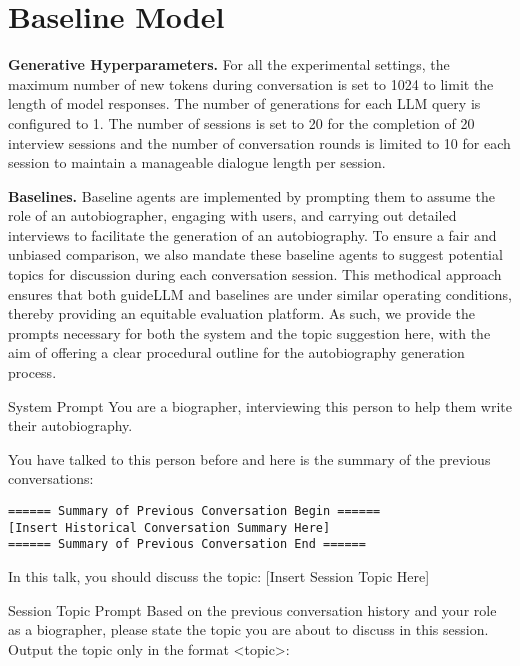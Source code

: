 \section{Baseline Model}\label{appendix:baseline_prompts}


\noindent\textbf{Generative Hyperparameters.} For all the experimental settings, the maximum number of new tokens during conversation is set to 1024 to limit the length of model responses. The number of generations for each LLM query is configured to 1. The number of sessions is set to 20 for the completion of 20 interview sessions and the number of conversation rounds is limited to 10 for each session to maintain a manageable dialogue length per session.


\noindent\textbf{Baselines.} Baseline agents are implemented by prompting them to assume the role of an autobiographer, engaging with users, and carrying out detailed interviews to facilitate the generation of an autobiography. To ensure a fair and unbiased comparison, we also mandate these baseline agents to suggest potential topics for discussion during each conversation session. This methodical approach ensures that both guideLLM and baselines are under similar operating conditions, thereby providing an equitable evaluation platform. As such, we provide the prompts necessary for both the system and the topic suggestion here, with the aim of offering a clear procedural outline for the autobiography generation process.

\begin{mybox}{System Prompt}\label{appendix:system_prompt}
You are a biographer, interviewing this person to help them write their autobiography.

You have talked to this person before and here is the summary of the previous conversations:
\begin{verbatim}
====== Summary of Previous Conversation Begin ======
[Insert Historical Conversation Summary Here]
====== Summary of Previous Conversation End ======
\end{verbatim}

In this talk, you should discuss the topic: [Insert Session Topic Here]
\end{mybox}

\begin{mybox}{Session Topic Prompt}
Based on the previous conversation history and your role as a biographer, please state the topic you are about to discuss in this session.
Output the topic only in the format <topic>:
\end{mybox}

